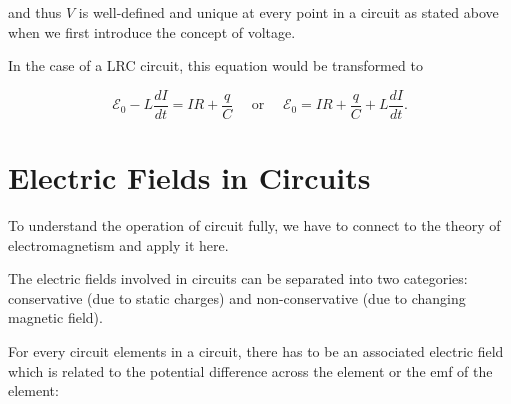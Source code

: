\documentclass[english,a4paper,12pt]{report}
\begin{document}
and thus \(V\) is well-defined and unique at every point in a circuit as stated above when we first introduce the concept of voltage.



In the case of a LRC circuit, this equation would be transformed to 

\begin{equation}
    \mathcal{E}_{0} - L\frac{dI}{dt} = IR + \frac{q}{C} \text {  ~~ or  ~~ } \mathcal{E}_{0} = IR + \frac{q}{C} + L\frac{dI}{dt} .  
\end{equation}

\section{Electric Fields in Circuits}

To understand the operation of circuit fully, we have to connect to the theory of electromagnetism and apply it here. 

The electric fields involved in circuits can be separated into two categories: conservative (due to static charges) and non-conservative (due to changing magnetic field).

For every circuit elements in a circuit, there has to be an associated electric field which is related to the potential difference across the element or the emf of the element:
\end{document}

